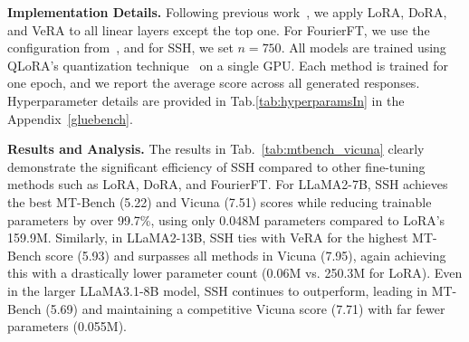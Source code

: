 \noindent \textbf{Implementation Details.}  
Following previous work~\cite{dettmers2024qlora,dettmers20228bit}, we apply LoRA, DoRA, and VeRA to all linear layers except the top one. For FourierFT, we use the configuration from~\cite{gao2024parameter}, and for SSH, we set \(n = 750\). All models are trained using QLoRA’s quantization technique~\cite{dettmers2024qlora} on a single GPU. Each method is trained for one epoch, and we report the average score across all generated responses. Hyperparameter details are provided in Tab.\ref{tab:hyperparamsIn} in the Appendix~\ref{gluebench}.


\noindent \textbf{Results and Analysis.}  
The results in Tab.~\ref{tab:mtbench_vicuna} clearly demonstrate the significant efficiency of SSH compared to other fine-tuning methods such as LoRA, DoRA, and FourierFT. For LLaMA2-7B, SSH achieves the best MT-Bench (5.22) and Vicuna (7.51) scores while reducing trainable parameters by over 99.7\%, using only 0.048M parameters compared to LoRA's 159.9M. Similarly, in LLaMA2-13B, SSH ties with VeRA for the highest MT-Bench score (5.93) and surpasses all methods in Vicuna (7.95), again achieving this with a drastically lower parameter count (0.06M vs. 250.3M for LoRA). Even in the larger LLaMA3.1-8B model, SSH continues to outperform, leading in MT-Bench (5.69) and maintaining a competitive Vicuna score (7.71) with far fewer parameters (0.055M). 



